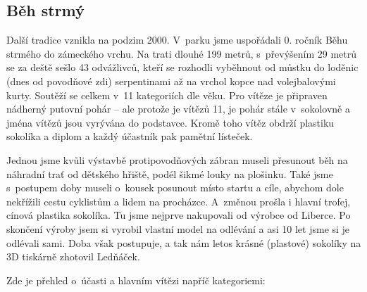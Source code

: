 \documentclass[a5paper, 12pt, twoside]{article}
\begin{document}
\subsection{Běh strmý}

Další tradice vznikla na podzim 2000. V~parku jsme uspořádali 0. ročník
Běhu strmého do zámeckého vrchu. Na trati dlouhé 199 metrů, s~převýšením
29 metrů se za deště sešlo 43 odvážlivců, kteří se rozhodli vyběhnout od
můstku do loděnic (dnes od povodňové zdi) serpentinami až na vrchol
kopce nad volejbalovými kurty. Soutěží se celkem v~11 kategoriích dle
věku. Pro vítěze je připraven nádherný putovní pohár -- ale protože je
vítězů 11, je pohár stále v~sokolovně a jména vítězů jsou vyrývána do
podstavce. Kromě toho vítěz obdrží plastiku sokolíka a diplom a každý
účastník pak pamětní lísteček.

Jednou jsme kvůli výstavbě protipovodňových zábran museli přesunout běh
na náhradní trať od dětského hřiště, podél šikmé louky na plošinku. Také
jsme s~postupem doby museli o~kousek posunout místo startu a cíle,
abychom dole nekřížili cestu cyklistům a lidem na procházce. A~změnou
prošla i hlavní trofej, cínová plastika sokolíka. Tu jsme nejprve
nakupovali od výrobce od Liberce. Po skončení výroby jsem si vyrobil
vlastní model na odlévání a asi 10 let jsme si je odlévali sami. Doba
však postupuje, a tak nám letos krásné (plastové) sokolíky na 3D
tiskárně zhotovil Ledňáček.

Zde je přehled o~účasti a hlavním vítězi napříč kategoriemi:
\end{document}
